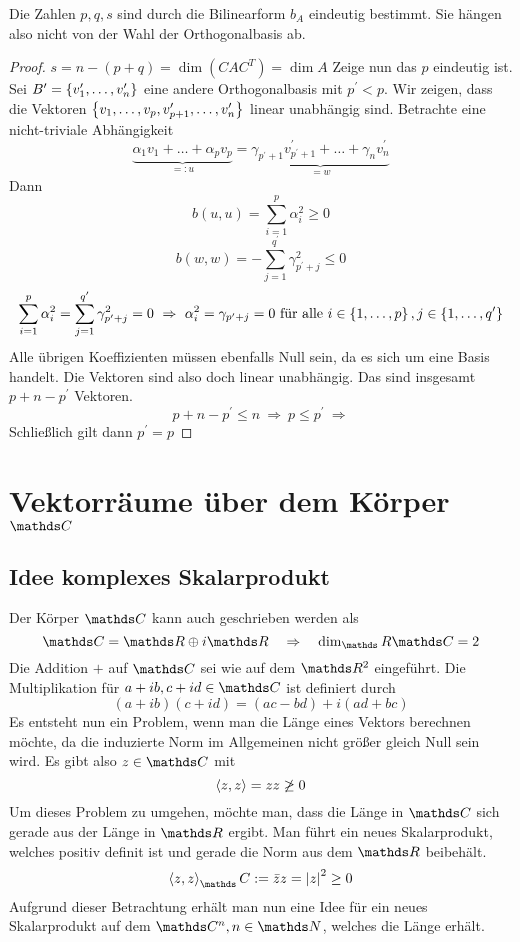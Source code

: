 			\begin{theorem}
				Die Zahlen $p,q,s$ sind durch die Bilinearform $b_A$ eindeutig bestimmt.
				Sie hängen also nicht von der Wahl der Orthogonalbasis ab.
			\end{theorem}
			\begin{proof}
				$s=n-(p+q) = \dim (CAC^T) = \dim A$
				Zeige nun das $p$ eindeutig ist.
				Sei $B^\prime = \left\{ v_1^\prime,\ldots,v_n^\prime \right\}$ eine andere Orthogonalbasis mit $p^\prime < p$.
				Wir zeigen, dass die Vektoren $\left\{ v_1,\ldots, v_p, v^\prime_{p+1},\ldots, v^\prime_n \right\}$ linear unabhängig sind.
				Betrachte eine nicht-triviale Abhängigkeit
				\[ \underbrace{ \alpha_1v_1 + \ldots + \alpha_pv_p }_{=:u} = \underbrace{ \gamma_{p^\prime +1}v^\prime_{p^\prime +1} + \ldots + \gamma_nv^\prime_n }_{=w} \]
				Dann
				\[ b(u,u) = \sum_{i=1}^p \alpha_i^2 \geq 0 \]
				\[ b(w,w) = -\sum_{j=1}^{q^\prime} \gamma^2_{p^\prime +j} \leq 0 \]
				\[ \sum_{i=1}^p \alpha_i^2 = \sum_{j=1}^{q^\prime} \gamma^2_{p^\prime +j} = 0 \ \Rightarrow \ \alpha_i^2 = \gamma_{p^\prime +j} = 0 \text{ für alle } i\in\curlb{1,\ldots,p}, j\in\curlb{1,\ldots,q^\prime} \]
				Alle übrigen Koeffizienten müssen ebenfalls Null sein, da es sich um eine Basis handelt.
				Die Vektoren sind also doch linear unabhängig.
				Das sind insgesamt $p+n-p^\prime$ Vektoren.
				\[ p+n-p^\prime \leq n \ \Rightarrow \ p\leq p^\prime \ \Rightarrow  \]
				Schließlich gilt dann $p^\prime = p$
			\end{proof}



	\section{Vektorräume über dem Körper $\SC$} %
	\label{sec:der_k_rper_}

		\subsection{Idee komplexes Skalarprodukt} %
		\label{sub:idee_komplexes_skalarprodukt}
	
			Der Körper $\SC$ kann auch geschrieben werden als
			\[ \SC = \SR \oplus i\SR \quad \Rightarrow \quad \dim_\SR\SC = 2 \]
			Die Addition $+$ auf $\SC$ sei wie auf dem $\SR^2$ eingeführt.
			Die Multiplikation für $a+ib,c+id\in\SC$ ist definiert durch
			\[ (a+ib)(c+id) = (ac-bd) + i(ad+bc) \]
			Es entsteht nun ein Problem, wenn man die Länge eines Vektors berechnen möchte, da die induzierte Norm im Allgemeinen nicht größer gleich Null sein wird.
			Es gibt also $z\in\SC$ mit
			\[ \left\langle z,z \right\rangle = zz \not\geq 0 \]
			Um dieses Problem zu umgehen, möchte man, dass die Länge in $\SC$ sich gerade aus der Länge in $\SR$ ergibt.
			Man führt ein neues Skalarprodukt, welches positiv definit ist und gerade die Norm aus dem $\SR$ beibehält.
			\[ \angleb{z,z}_\SC := \bar{z}z = \abs{z}^2 \geq 0 \]
			Aufgrund dieser Betrachtung erhält man nun eine Idee für ein neues Skalarprodukt auf dem $\SC^n, n\in\SN$, welches die Länge erhält.

